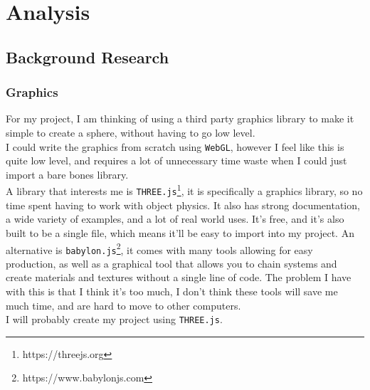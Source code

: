 \chapter{Analysis}

\section{Background Research}
\subsection{Graphics}
For my project, I am thinking of using a third party graphics library to make it simple to create a sphere, without having to go low level. \\
I could write the graphics from scratch using \verb|WebGL|, however I feel like this is quite low level, and requires a lot of unnecessary time waste when I could just import a bare bones library. \\
A library that interests me is \verb|THREE.js|\footnote{https://threejs.org}, it is specifically a graphics library, so no time spent having to work with object physics. It also has strong documentation, a wide variety of examples, and a lot of real world uses. It's free, and it's also built to be a single file, which means it'll be easy to import into my project.
An alternative is \verb|babylon.js|\footnote{https://www.babylonjs.com}, it comes with many tools allowing for easy production, as well as a graphical tool that allows you to chain systems and create materials and textures without a single line of code. The problem I have with this is that I think it's too much, I don't think these tools will save me much time, and are hard to move to other computers. \\

I will probably create my project using \verb|THREE.js|.

\newpage
